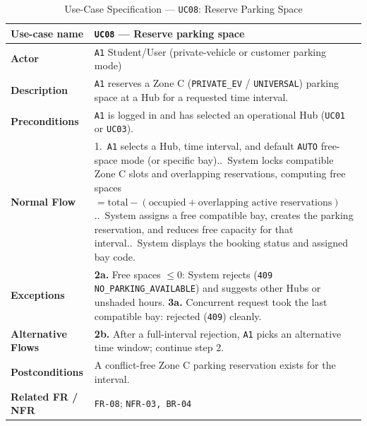 \begin{table}[H]
  \centering
  \singlespacing\footnotesize
  \caption{Use-Case Specification --- \texttt{UC08}: Reserve Parking Space}
  \label{tab:uc08}
  \renewcommand{\arraystretch}{1.13}
  \begin{tabularx}{\textwidth}{|L{2.9cm}|Y|}
    \hline
    \textbf{Use-case name} & \textbf{\texttt{UC08} --- Reserve parking space} \\
    \hline
    \textbf{Actor} & \texttt{A1} Student/User (private-vehicle or customer parking mode) \\
    \hline
    \textbf{Description} & \texttt{A1} reserves a Zone C (\texttt{PRIVATE\_\allowbreak EV} / \texttt{UNIVERSAL}) parking space at a Hub for a requested time interval. \\
    \hline
    \textbf{Preconditions} & \texttt{A1} is logged in and has selected an operational Hub (\texttt{UC01} or \texttt{UC03}). \\
    \hline
    \textbf{Normal Flow} & 1.\ \texttt{A1} selects a Hub, time interval, and default \texttt{AUTO} free-space mode (or specific bay)..\ System locks compatible Zone C slots and overlapping reservations, computing free spaces $= \text{total} - (\text{occupied} + \text{overlapping active reservations})$..\ System assigns a free compatible bay, creates the parking reservation, and reduces free capacity for that interval..\ System displays the booking status and assigned bay code. \\
    \hline
    \textbf{Exceptions} & \textbf{2a.} Free spaces $\le 0$: System rejects (\texttt{409 NO\_\allowbreak PARKING\_\allowbreak AVAILABLE}) and suggests other Hubs or unshaded hours.\newline
    \textbf{3a.} Concurrent request took the last compatible bay: rejected (\texttt{409}) cleanly. \\
    \hline
    \textbf{Alternative Flows} & \textbf{2b.} After a full-interval rejection, \texttt{A1} picks an alternative time window; continue step 2. \\
    \hline
    \textbf{Postconditions} & A conflict-free Zone C parking reservation exists for the interval. \\
    \hline
    \textbf{Related FR / NFR} & \texttt{FR-08}; \texttt{NFR-03, BR-04} \\
    \hline
  \end{tabularx}
\end{table}


